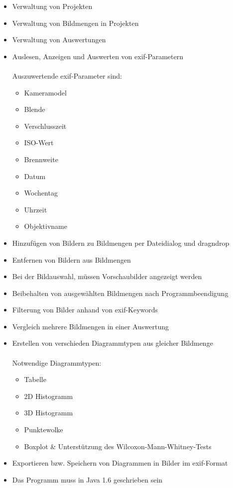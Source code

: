 \begin{itemize}
	\item Verwaltung von Projekten
	\item Verwaltung von Bildmengen in Projekten
	\item Verwaltung von Auswertungen
	\item Auslesen, Anzeigen und Auswerten von \gls{exif}-Parametern\\\\
				Auszuwertende \gls{exif}-Parameter sind:
				\label{subsec:auszuwertendedaten}
				\begin{itemize}
					\item Kameramodel
					\item Blende 
					\item Verschlusszeit
					\item ISO-Wert
					\item Brennweite
					\item Datum
					\item Wochentag
					\item Uhrzeit
					\item Objektivname
				\end{itemize}
	\item Hinzufügen von Bildern zu Bildmengen per Dateidialog und \gls{dragndrop}
	\item Entfernen von Bildern aus Bildmengen
	\item Bei der Bildauswahl, müssen Vorschaubilder angezeigt werden
	\item Beibehalten von ausgewählten Bildmengen nach Programmbeendigung
	\item Filterung von Bilder anhand von \gls{exif}-Keywords
	\item Vergleich mehrere Bildmengen in einer Auswertung
	\item Erstellen von verschieden Diagrammtypen aus gleicher Bildmenge\\\\
				Notwendige Diagrammtypen:
				\begin{itemize}
					\item Tabelle
					\item 2D Histogramm
					\item 3D Histogramm
					\item Punktewolke
					\item Boxplot \& Unterstützung des Wilcoxon-Mann-Whitney-Tests
				\end{itemize}
	\item Exportieren bzw. Speichern von Diagrammen in Bilder im \gls{exif}-Format
	\item Das Programm muss in Java 1.6 geschrieben sein
\end{itemize}


